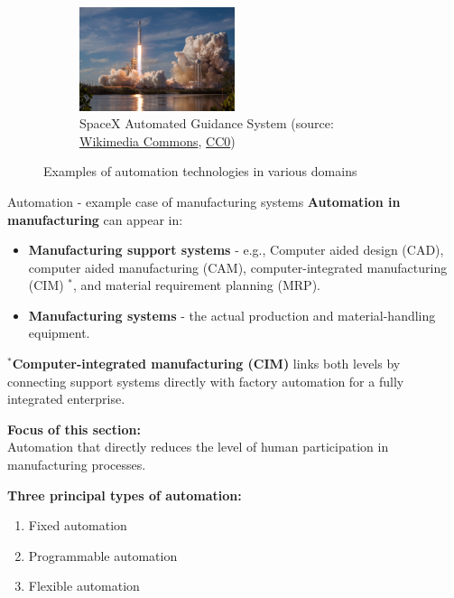 \begin{frame}
\begin{figure}
\begin{subfigure}[b]{0.49\textwidth}
			\includegraphics[width=0.5\textwidth]{fig/lec01/Falcon_Heavy_Demo_Mission_(40126461851).jpg}
			\caption{SpaceX Automated Guidance System (source: \href{https://commons.wikimedia.org/wiki/File:Falcon_Heavy_Demo_Mission_(40126461851).jpg}{Wikimedia Commons},  \href{https://creativecommons.org/public-domain/cc0/}{CC0})}
		\end{subfigure}
		\vspace{-0.5cm}
		\caption*{Examples of automation technologies in various domains} 
        \label{fig:examples_machine_drives_01}
	\end{figure}
\end{frame}

\begin{frame}{Automation - example case of manufacturing systems}
\textbf{Automation in manufacturing} can appear in:
\begin{itemize}
  \item \textbf{Manufacturing support systems} - e.g., Computer aided design (CAD), computer aided manufacturing (CAM), computer-integrated manufacturing (CIM) $^*$, and material requirement planning (MRP).
  \item \textbf{Manufacturing systems} - the actual production and material-handling equipment.
\end{itemize}

$^*$\textbf{Computer-integrated manufacturing (CIM)} links both levels by connecting support systems directly with factory automation for a fully integrated enterprise.

\vspace{3mm}
\textbf{Focus of this section:}\\
Automation that directly reduces the level of human participation in manufacturing processes.

\vspace{3mm}
\textbf{Three principal types of automation:}
\begin{enumerate}
  \item Fixed automation
  \item Programmable automation
  \item Flexible automation
\end{enumerate}
\end{frame}

